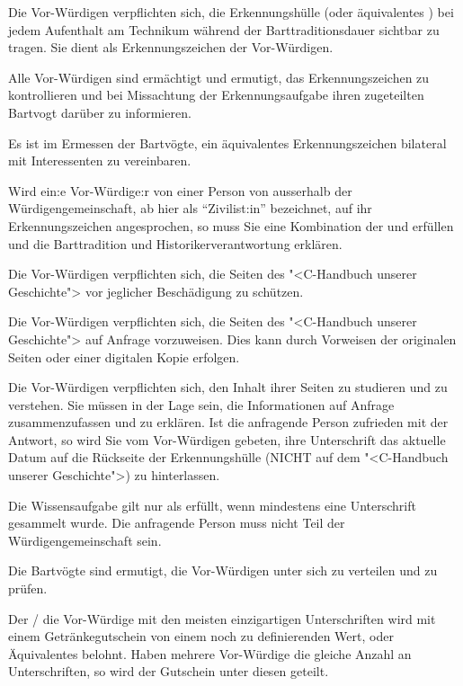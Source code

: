 \documentclass[fontsize=12pt,parskip=half]{scrartcl}
\begin{document}
\begin{contract}
  \SubClause[title={Erkennungsaufgabe}]\label{H.erkennungsaufgabe}
  Die Vor-Würdigen verpflichten sich, die Erkennungshülle (oder äquivalentes ) bei jedem Aufenthalt am Technikum während der
  Barttraditionsdauer sichtbar zu tragen. Sie dient als Erkennungszeichen der Vor-Würdigen.

  Alle Vor-Würdigen sind ermächtigt und ermutigt, das Erkennungszeichen zu kontrollieren und bei Missachtung der Erkennungsaufgabe ihren zugeteilten Bartvogt darüber zu informieren.

  Es ist im Ermessen der Bartvögte, ein äquivalentes Erkennungszeichen bilateral mit Interessenten zu vereinbaren.\label{aequivalentes}

  Wird ein:e Vor-Würdige:r von einer Person von ausserhalb der Würdigengemeinschaft, ab hier als ``Zivilist:in'' bezeichnet, auf ihr Erkennungszeichen angesprochen, so muss Sie eine Kombination
  der  und  erfüllen und die Barttradition und Historikerverantwortung  erklären.

  \SubClause[title={Schutzaufgabe}]\label{H.schutzaufgabe}
  Die Vor-Würdigen verpflichten sich, die Seiten des "<C-Handbuch unserer Geschichte"> vor jeglicher Beschädigung zu schützen.

  \SubClause[title={Vorweisaufgabe}]\label{H.vorweisaufgabe}
  Die Vor-Würdigen verpflichten sich, die Seiten des "<C-Handbuch unserer Geschichte"> auf Anfrage vorzuweisen. Dies kann durch Vorweisen der originalen
  Seiten oder einer digitalen Kopie erfolgen.

  \SubClause[title={Wissensaufgabe}]\label{H.wissensaufgabe}
  Die Vor-Würdigen verpflichten sich, den Inhalt ihrer Seiten zu studieren und zu verstehen. Sie müssen in der Lage sein, die Informationen
  auf Anfrage zusammenzufassen und zu erklären. Ist die anfragende Person zufrieden mit der Antwort, so wird Sie vom Vor-Würdigen gebeten,
  ihre Unterschrift das aktuelle Datum auf die Rückseite der Erkennungshülle (NICHT auf dem "<C-Handbuch unserer Geschichte">) zu hinterlassen.

  Die Wissensaufgabe gilt nur als erfüllt, wenn mindestens eine Unterschrift gesammelt wurde. Die anfragende Person muss nicht Teil der Würdigengemeinschaft sein.

  Die Bartvögte sind ermutigt, die Vor-Würdigen unter sich zu verteilen und zu prüfen.

  Der / die Vor-Würdige mit den meisten einzigartigen Unterschriften wird mit einem Getränkegutschein von einem noch zu definierenden Wert, oder Äquivalentes
  belohnt. Haben mehrere Vor-Würdige die gleiche Anzahl an Unterschriften, so wird der Gutschein unter diesen geteilt.


\end{contract}
\end{document}
